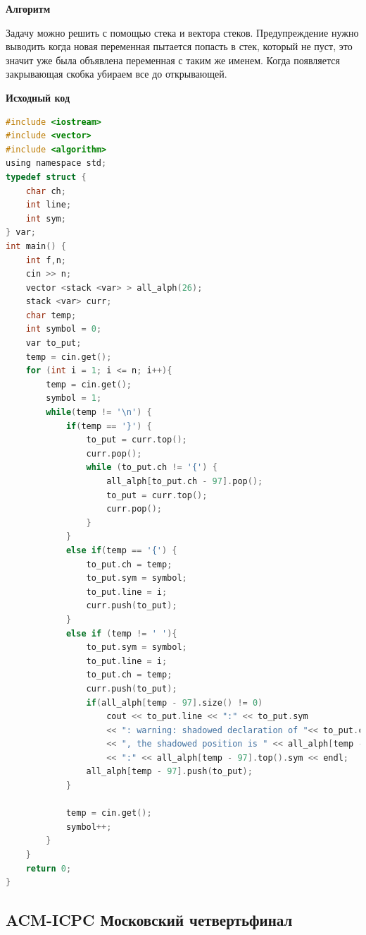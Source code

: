 \documentclass[a4paper,12pt]{article}
\begin{document}
\textbf{{\large Алгоритм}}

Задачу можно решить с помощью стека и вектора стеков. Предупреждение нужно выводить когда новая переменная пытается попасть в стек, который не пуст, это значит уже была объявлена переменная с таким же именем. Когда появляется закрывающая скобка убираем все до открывающей.

\newpage
\textbf{{\large Исходный код}} \\
\begin{lstlisting}[language=C]
#include <iostream>
#include <vector>
#include <algorithm>
using namespace std;
typedef struct {
    char ch;
    int line;
    int sym;
} var;
int main() {
    int f,n;
    cin >> n;
    vector <stack <var> > all_alph(26);
    stack <var> curr;
    char temp;
    int symbol = 0;
    var to_put;
    temp = cin.get();
    for (int i = 1; i <= n; i++){
        temp = cin.get();
        symbol = 1;
        while(temp != '\n') {
            if(temp == '}') {
                to_put = curr.top();
                curr.pop();
                while (to_put.ch != '{') {
                    all_alph[to_put.ch - 97].pop();
                    to_put = curr.top();
                    curr.pop();
                }
            }
            else if(temp == '{') {
                to_put.ch = temp;
                to_put.sym = symbol;
                to_put.line = i;
                curr.push(to_put);
            }
            else if (temp != ' '){
                to_put.sym = symbol;
                to_put.line = i;
                to_put.ch = temp;
                curr.push(to_put);
                if(all_alph[temp - 97].size() != 0)
                    cout << to_put.line << ":" << to_put.sym
                    << ": warning: shadowed declaration of "<< to_put.ch
                    << ", the shadowed position is " << all_alph[temp - 97].top().line
                    << ":" << all_alph[temp - 97].top().sym << endl;
                all_alph[temp - 97].push(to_put);
            }

            temp = cin.get();
            symbol++;
        }
    }
    return 0;
}
\end{lstlisting}



%
%
\newpage
\subsection{ACM-ICPC Московский четвертьфинал}
\end{document}
